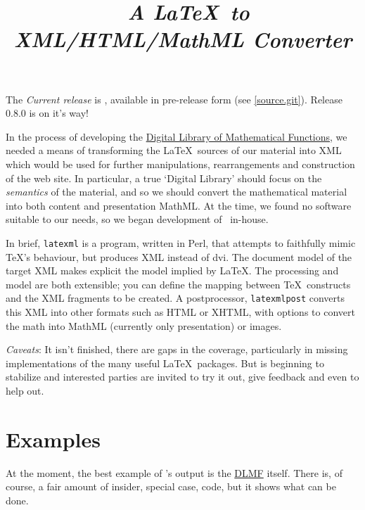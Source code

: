 \documentclass{article}
\title{\LaTeXML\ \emph{A \LaTeX\ to XML/HTML/MathML Converter}}
\begin{document}
\label{top}
\maketitle

The \emph{Current release} is ,
available in pre-release form (see \ref{source.git}).
Release 0.8.0 is on it's way!

In the process of developing the
\href{http://dlmf.nist.gov/}{Digital Library of Mathematical Functions},
we needed a means of transforming
the \LaTeX\ sources of our material into XML which would be used
for further manipulations, rearrangements and construction of the web site.
In particular, a true `Digital Library' should focus on the \emph{semantics}
of the material, and so we should convert the mathematical material into both
content and presentation MathML.
At the time, we found no software suitable to our needs, so we began
development of \LaTeXML\ in-house.  

In brief, \texttt{latexml} is a program, written in Perl, that attempts to
faithfully mimic \TeX's behaviour, but produces XML instead of dvi.
The document model of the target XML makes explicit the model implied
by \LaTeX.
The processing and model are both extensible; you can define
the mapping between \TeX\ constructs and the XML fragments to be created.
A postprocessor, \texttt{latexmlpost} converts this
XML into other formats such as HTML or XHTML, with options
to convert the math into MathML (currently only presentation) or images.

\emph{Caveats}: It isn't finished, there are gaps in the coverage,
particularly in missing implementations of the many useful \LaTeX\ packages.
But is beginning to stabilize and interested parties
are invited to try it out, give feedback and even to help out.


\section{Examples}\label{examples}
At the moment, the best example of \LaTeXML's output is 
the \href{http://dlmf.nist.gov/}{DLMF} itself.
There is, of course, a fair amount of insider, special case,
code, but it shows what can be done.
\end{document}
